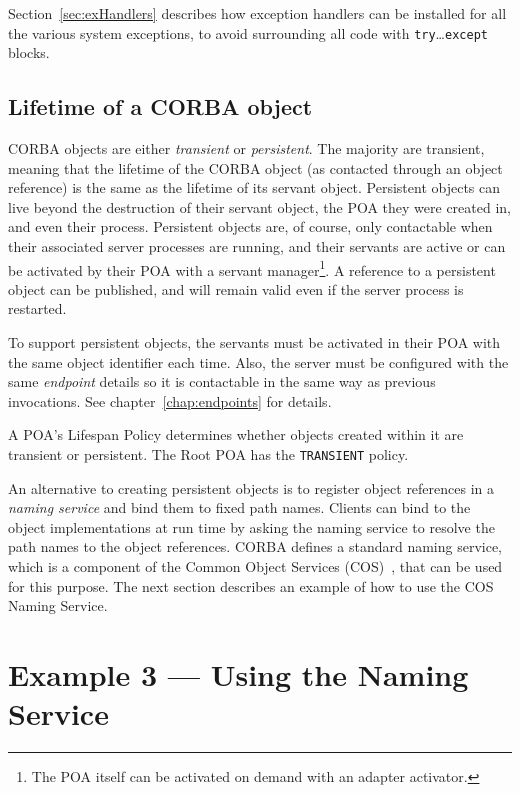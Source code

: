 \documentclass[11pt,oneside,a4paper]{book}
\newcommand{\code}[1]{\texttt{#1}}
\newcommand{\term}[1]{\textit{#1}}
\begin{document}
Section~\ref{sec:exHandlers} describes how exception handlers can be
installed for all the various system exceptions, to avoid surrounding
all code with \code{try}\dots\code{except} blocks.


\subsection{Lifetime of a CORBA object}

CORBA objects are either \term{transient} or \term{persistent}. The
majority are transient, meaning that the lifetime of the CORBA object
(as contacted through an object reference) is the same as the lifetime
of its servant object. Persistent objects can live beyond the
destruction of their servant object, the POA they were created in, and
even their process. Persistent objects are, of course, only
contactable when their associated server processes are running, and
their servants are active or can be activated by their POA with a
servant manager\footnote{The POA itself can be activated on demand
  with an adapter activator.}. A reference to a persistent object can
be published, and will remain valid even if the server process is
restarted.

To support persistent objects, the servants must be activated in their
POA with the same object identifier each time. Also, the server must
be configured with the same \term{endpoint} details so it is
contactable in the same way as previous invocations. See
chapter~\ref{chap:endpoints} for details.

A POA's Lifespan Policy determines whether objects created within it
are transient or persistent. The Root POA has the \code{TRANSIENT}
policy.

An alternative to creating persistent objects is to register object
references in a \term{naming service} and bind them to fixed path
names. Clients can bind to the object implementations at run time by
asking the naming service to resolve the path names to the object
references. CORBA defines a standard naming service, which is a
component of the Common Object Services (COS)~\cite{corbaservices},
that can be used for this purpose. The next section describes an
example of how to use the COS Naming Service.



\section{Example 3 --- Using the Naming Service}
\label{sec:usingNS}
\end{document}
